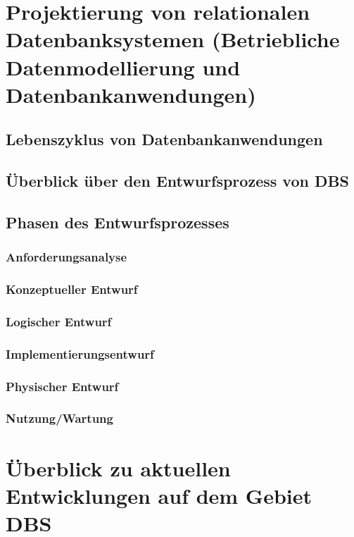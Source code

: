 \chapter{Projektierung von relationalen Datenbanksystemen (Betriebliche Datenmodellierung und Datenbankanwendungen)}
\section{Lebenszyklus von Datenbankanwendungen}
\section{Überblick über den Entwurfsprozess von DBS}
\section{Phasen des Entwurfsprozesses}
\subsection{Anforderungsanalyse}
\subsection{Konzeptueller Entwurf}
\subsection{Logischer Entwurf}
\subsection{Implementierungsentwurf}
\subsection{Physischer Entwurf}
\subsection{Nutzung/Wartung}

\chapter{Überblick zu aktuellen Entwicklungen auf dem Gebiet DBS}


